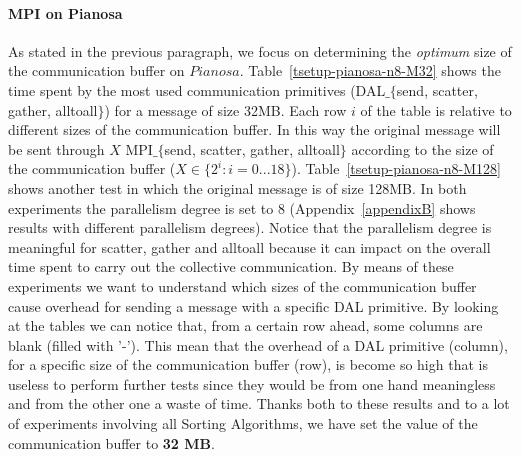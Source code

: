 \paragraph{MPI on Pianosa}
\label{test-env-pianosa}
As stated in the previous paragraph, we focus on determining the \textit{optimum} size of the communication buffer on $Pianosa$. Table~\ref{tsetup-pianosa-n8-M32} shows the time spent by the most used communication primitives (DAL$\_\lbrace$send, scatter, gather, alltoall$\rbrace$) for a message of size 32MB. Each row $i$ of the table is relative to different sizes of the communication buffer. In this way the original message will be sent through $X$ MPI$\_\lbrace$send, scatter, gather, alltoall$\rbrace$ according to the size of the communication buffer ($X \in \lbrace 2^i : i = 0...18 \rbrace$). Table~\ref{tsetup-pianosa-n8-M128} shows another test in which the original message is of size 128MB. In both experiments the parallelism degree is set to 8 (Appendix~\ref{appendixB} shows results with different parallelism degrees). Notice that the parallelism degree is meaningful for scatter, gather and alltoall because it can impact on the overall time spent to carry out the collective communication. By means of these experiments we want to understand which sizes of the communication buffer cause overhead for sending a message with a specific DAL primitive. By looking at the tables we can notice that, from a certain row ahead, some columns are blank (filled with '-'). This mean that the overhead of a DAL primitive (column), for a specific size of the communication buffer (row), is become so high that is useless to perform further tests since they would be from one hand meaningless and from the other one a waste of time. Thanks both to these results and to a lot of experiments involving all Sorting Algorithms, we have set the value of the communication buffer to \textbf{32 MB}. 

